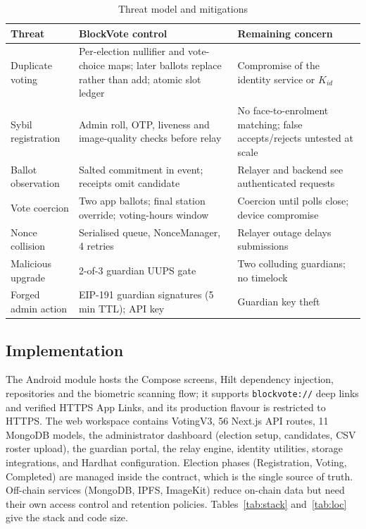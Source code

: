 \documentclass[conference]{IEEEtran}
\newcommand{\code}[1]{\texttt{\small #1}}
\begin{document}
\begin{table}[t]
\caption{Threat model and mitigations}
\label{tab:threat}
\centering
\footnotesize
\begin{tabular}{@{}p{1.45cm}p{3.35cm}p{2.95cm}@{}}
\toprule
\textbf{Threat} & \textbf{BlockVote control} & \textbf{Remaining concern} \\
\midrule
Duplicate voting & Per-election nullifier and vote-choice maps; later ballots replace rather than add; atomic slot ledger & Compromise of the identity service or $K_{id}$ \\
Sybil registration & Admin roll, OTP, liveness and image-quality checks before relay & No face-to-enrolment matching; false accepts/rejects untested at scale \\
Ballot observation & Salted commitment in event; receipts omit candidate & Relayer and backend see authenticated requests \\
Vote coercion & Two app ballots; final station override; voting-hours window & Coercion until polls close; device compromise \\
Nonce collision & Serialised queue, NonceManager, 4 retries & Relayer outage delays submissions \\
Malicious upgrade & 2-of-3 guardian UUPS gate & Two colluding guardians; no timelock \\
Forged admin action & EIP-191 guardian signatures (5\,min TTL); API key & Guardian key theft \\
\bottomrule
\end{tabular}
\end{table}

\subsection{Implementation}
The Android module hosts the Compose screens, Hilt dependency injection, repositories and the biometric scanning flow; it supports \code{blockvote://} deep links and verified HTTPS App Links, and its production flavour is restricted to HTTPS. The web workspace contains VotingV3, 56 Next.js API routes, 11 MongoDB models, the administrator dashboard (election setup, candidates, CSV roster upload), the guardian portal, the relay engine, identity utilities, storage integrations, and Hardhat configuration. Election phases (Registration, Voting, Completed) are managed inside the contract, which is the single source of truth. Off-chain services (MongoDB, IPFS, ImageKit) reduce on-chain data but need their own access control and retention policies. Tables~\ref{tab:stack} and~\ref{tab:loc} give the stack and code size.
\end{document}
